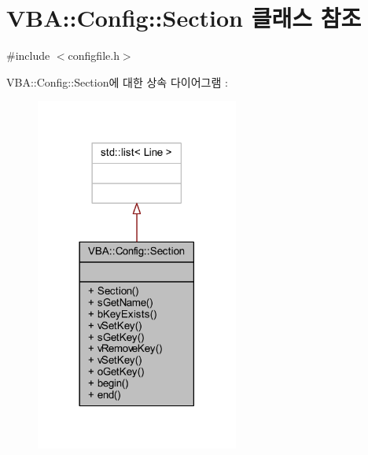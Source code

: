 \hypertarget{class_v_b_a_1_1_config_1_1_section}{}\section{V\+BA\+:\+:Config\+:\+:Section 클래스 참조}
\label{class_v_b_a_1_1_config_1_1_section}


{\ttfamily \#include $<$configfile.\+h$>$}



V\+BA\+:\+:Config\+:\+:Section에 대한 상속 다이어그램 \+: \nopagebreak
\begin{figure}[H]
\begin{center}
\leavevmode
\includegraphics[width=189pt]{class_v_b_a_1_1_config_1_1_section__inherit__graph}
\end{center}
\end{figure}



